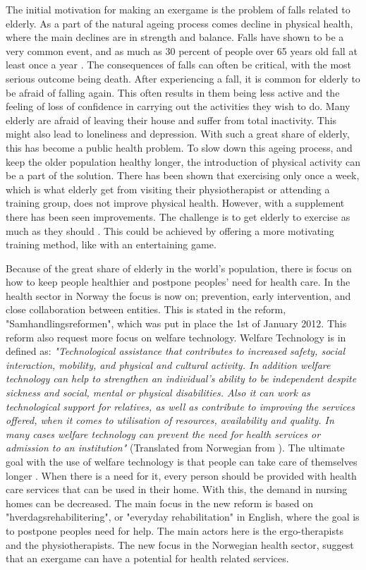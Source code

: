 The initial motivation for making an exergame is the problem of falls related to elderly. As a part of the natural ageing process comes decline in physical health, where the main declines are in strength and balance. Falls have shown to be a very common event, and as much as 30 percent of people over 65 years old fall at least once a year \cite{otago}. The consequences of falls can often be critical, with the most serious outcome being death. After experiencing a fall, it is common for elderly to be afraid of falling again. This often results in them being less active and the feeling of loss of confidence in carrying out the activities they wish to do. Many elderly are afraid of leaving their house and suffer from total inactivity. This might also lead to loneliness and depression. With such a great share of elderly, this has become a public health problem. To slow down this ageing process, and keep the older population healthy longer, the introduction of physical activity can be a part of the solution. There has been shown that exercising only once a week, which is what elderly get from visiting their physiotherapist or attending a training group, does not improve physical health. However, with a supplement there has been seen improvements. The challenge is to get elderly to exercise as much as they should \cite{statistikknorge12}. This could be achieved by offering a more motivating training method, like with an entertaining game.

Because of the great share of elderly in the world's population, there is focus on how to keep people healthier and postpone peoples' need for health care.  In the health sector in Norway the focus is now on; prevention, early intervention, and close collaboration between entities. This is stated in the reform, "Samhandlingsreformen", which was put in place the 1st of January 2012. This reform also request more focus on welfare technology. Welfare Technology is in \cite{welfare} defined as: \emph{"Technological assistance that contributes to increased safety, social interaction, mobility, and physical and cultural activity. In addition welfare technology can help to strengthen an individual's ability to be independent despite sickness and social, mental or physical disabilities. Also it can work as technological support for relatives, as well as contribute to improving the services offered, when it comes to utilisation of resources, availability and quality. In many cases welfare technology can prevent the need for health services or admission to an institution"} (Translated from Norwegian from \cite{welfare}). The ultimate goal with the use of welfare technology is that people can take care of themselves longer \cite{regjering}. When there is a need for it, every person should be provided with health care services that can be used in their home. With this, the demand in nursing homes can be decreased. The main focus in the new reform is based on "hverdagsrehabilitering", or "everyday rehabilitation" in English, where the goal is to postpone peoples need for help. The main actors here is the ergo-therapists and the physiotherapists. The new focus in the Norwegian health sector, suggest that an exergame can have a potential for health related services.

